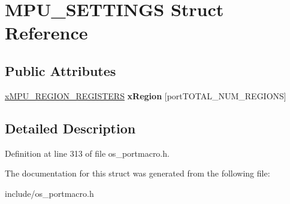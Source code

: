 \hypertarget{structMPU__SETTINGS}{}\section{M\+P\+U\+\_\+\+S\+E\+T\+T\+I\+N\+GS Struct Reference}
\label{structMPU__SETTINGS}
\subsection*{Public Attributes}
\begin{DoxyCompactItemize}
\item 
\mbox{\label{structMPU__SETTINGS_aee3b73ca987a7d370e04662b32d20857}} 
\mbox{\hyperlink{structMPU__REGION__REGISTERS}{x\+M\+P\+U\+\_\+\+R\+E\+G\+I\+O\+N\+\_\+\+R\+E\+G\+I\+S\+T\+E\+RS}} {\bfseries x\+Region} \mbox{[}port\+T\+O\+T\+A\+L\+\_\+\+N\+U\+M\+\_\+\+R\+E\+G\+I\+O\+NS\mbox{]}
\end{DoxyCompactItemize}


\subsection{Detailed Description}


Definition at line 313 of file os\+\_\+portmacro.\+h.



The documentation for this struct was generated from the following file\+:\begin{DoxyCompactItemize}
\item 
include/os\+\_\+portmacro.\+h\end{DoxyCompactItemize}
